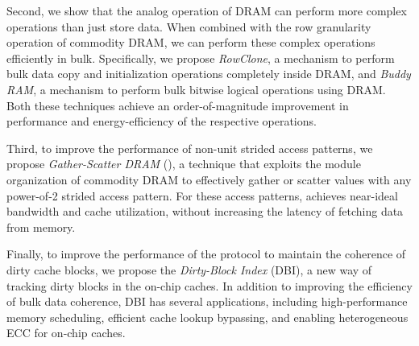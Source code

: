 Second, we show that the analog operation of DRAM can perform more complex
operations than just store data. When combined with the row granularity
operation of commodity DRAM, we can perform these complex operations
efficiently in bulk. Specifically, we propose \emph{RowClone}, a mechanism
to perform bulk data copy and initialization operations completely inside
DRAM, and \emph{Buddy RAM}, a mechanism to perform bulk bitwise logical
operations using DRAM. Both these techniques achieve an order-of-magnitude
improvement in performance and energy-efficiency of the respective
operations.

Third, to improve the performance of non-unit strided access patterns, we
propose \emph{Gather-Scatter DRAM} (\gsdram), a technique that exploits the
module organization of commodity DRAM to effectively gather or scatter
values with any power-of-2 strided access pattern. For these access
patterns, \gsdram achieves near-ideal bandwidth and cache utilization,
without increasing the latency of fetching data from memory.

Finally, to improve the performance of the protocol to maintain
the coherence of dirty cache blocks, we propose the
\emph{Dirty-Block Index} (DBI), a new way of tracking dirty blocks
in the on-chip caches. In addition to improving the efficiency of
bulk data coherence, DBI has several applications, including
high-performance memory scheduling, efficient cache lookup
bypassing, and enabling heterogeneous ECC for on-chip caches.
